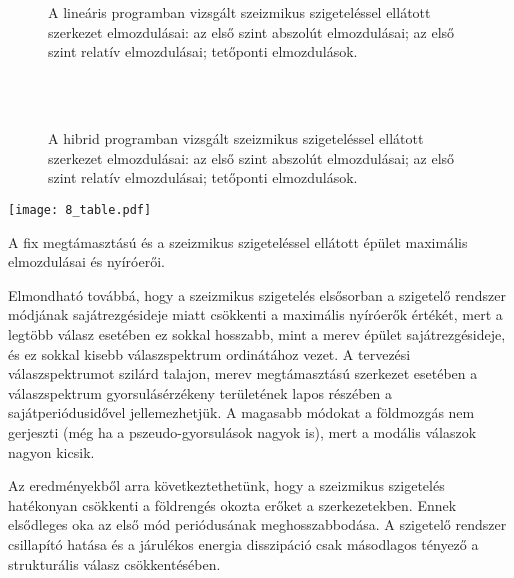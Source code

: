 \begin{figure}[!ht]%
\centering
{}%
\\
%
\\
%
\caption[A lineáris programban vizsgált szeizmikus szigeteléssel ellátott szerkezet elmozdulásai.]{A lineáris programban vizsgált szeizmikus szigeteléssel ellátott szerkezet elmozdulásai:
 az első szint abszolút elmozdulásai;
 az első szint relatív elmozdulásai; 
 tetőponti elmozdulások.}%
\label{fig:8_linbase}%
\end{figure}



\begin{figure}[!ht]%
\centering
{}%
\\
%
\\
%
\caption[A hibrid programban vizsgált szeizmikus szigeteléssel ellátott szerkezet elmozdulásai.]{A hibrid programban vizsgált szeizmikus szigeteléssel ellátott szerkezet elmozdulásai:
 az első szint abszolút elmozdulásai;
 az első szint relatív elmozdulásai; 
 tetőponti elmozdulások.}%
\label{fig:8_hibrid}%
\end{figure}



\begin{table}[h!]
\centering
\texttt{[image: 8\_table.pdf]}
\caption{A fix megtámasztású és a szeizmikus szigeteléssel ellátott épület maximális elmozdulásai és nyíróerői.}
\label{8_table}
\end{table}

Elmondható továbbá, hogy a szeizmikus szigetelés elsősorban a szigetelő rendszer  módjának sajátrezgésideje  miatt csökkenti a maximális nyíróerők értékét, mert a legtöbb válasz esetében ez sokkal hosszabb, mint a merev  épület sajátrezgésideje, és ez sokkal kisebb válaszspektrum ordinátához vezet.  A tervezési válaszspektrumot szilárd talajon, merev megtámasztású szerkezet esetében  a válaszspektrum  gyorsulásérzékeny területének lapos részében  a sajátperiódusidővel jellemezhetjük. A magasabb  módokat a földmozgás nem gerjeszti (még ha a pszeudo-gyorsulások nagyok is), mert a modális válaszok nagyon kicsik. 

Az eredményekből arra következtethetünk, hogy a szeizmikus szigetelés hatékonyan csökkenti a földrengés okozta erőket a szerkezetekben. Ennek elsődleges oka az  első mód periódusának meghosszabbodása. A szigetelő rendszer csillapító hatása és a járulékos energia disszipáció csak másodlagos tényező a strukturális válasz csökkentésében. 


